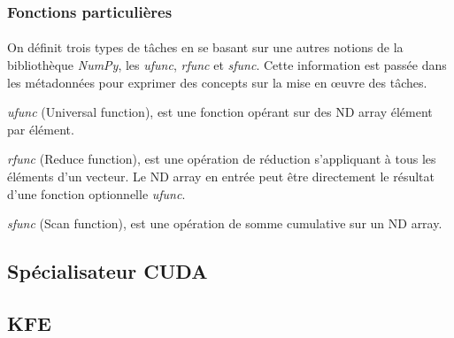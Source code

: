 \subsubsection{Fonctions particulières}
\paragraph{}
On définit trois types de tâches en se basant sur une autres notions de la
bibliothèque \emph{NumPy}, les \emph{ufunc}, \emph{rfunc} et \emph{sfunc}. Cette
information est passée dans les métadonnées pour exprimer des concepts sur la
mise en \oe{}uvre des tâches.

\emph{ufunc} (Universal function), est une fonction opérant sur des ND array
élément par élément.

\emph{rfunc} (Reduce function), est une opération de réduction s'appliquant à
tous les éléments d'un vecteur. Le ND array en entrée peut être directement le
résultat d'une fonction optionnelle \emph{ufunc}.

\emph{sfunc} (Scan function), est une opération de somme cumulative sur un ND
array.

\subsection{Spécialisateur CUDA}

\subsection{KFE}
